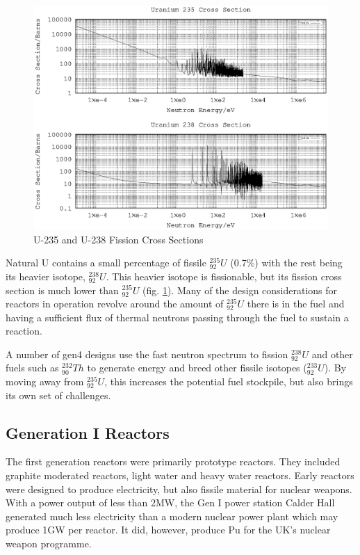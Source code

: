 \begin{figure}[tbp]
  \begin{center}
    \includegraphics[width=.8\linewidth]{chapters/introduction/plots/uranium_cross_section/u_xs}%
    \caption{U-235 and U-238 Fission Cross Sections}
    \label{figure:u235u238fissionxs}
  \end{center}
\end{figure}

Natural U contains a small percentage of fissile ${}^{235}_{92}U$ (0.7\%) with the rest being its heavier isotope, ${}^{238}_{92}U$.  This heavier isotope is \gls{fissionable}, but its fission cross section is much lower than ${}^{235}_{92}U$ (fig. \ref{figure:u235u238fissionxs}).  Many of the design considerations for reactors in operation revolve around the amount of ${}^{235}_{92}U$ there is in the fuel and having a sufficient flux of thermal neutrons passing through the fuel to sustain a reaction.

A number of \acrshort{gen4} designs use the fast neutron spectrum to fission ${}^{238}_{92}U$ and other fuels such as ${}^{232}_{90}Th$ to generate energy and breed other fissile isotopes (${}^{233}_{92}U$).  By moving away from ${}^{235}_{92}U$, this increases the potential fuel stockpile, but also brings its own set of challenges.


\FloatBarrier

\subsection{Generation I Reactors}

The first generation reactors were primarily prototype reactors.  They included graphite moderated reactors, light water and heavy water reactors.  Early reactors were designed to produce electricity, but also fissile material for nuclear weapons.  With a power output of less than 2MW, the Gen I power station Calder Hall generated much less electricity than a modern nuclear power plant which may produce 1GW per reactor.  It did, however, produce \Gls{Pu} for the UK's nuclear weapon programme.

